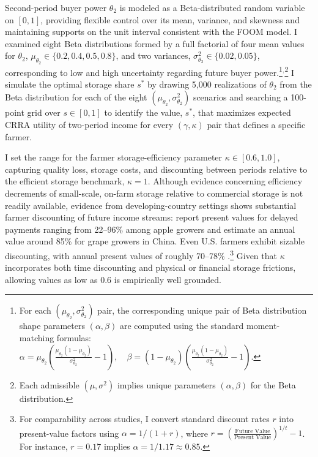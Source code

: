 Second-period buyer power $\theta_2$ is modeled as a Beta-distributed random variable on $[0,1]$, providing flexible control over its mean, variance, and skewness and maintaining supports on the unit interval consistent with the FOOM model. I examined eight Beta distributions formed by a full factorial of four mean values for $\theta_2$, 
$\mu_{\theta_2} \in \{0.2, 0.4, 0.5, 0.8\}$, and two variances, 
$\sigma^2_{\theta_2} \in \{0.02, 0.05\}$, corresponding to low and high uncertainty regarding future buyer power.\footnote{For each $(\mu_{\theta_2}, \sigma^2_{\theta_2})$ pair, the corresponding unique pair of Beta distribution shape parameters $(\alpha, \beta)$ are computed using the standard moment-matching formulas: $\alpha = \mu_{\theta_2} \left( \frac{\mu_{\theta_2}(1 - \mu_{\theta_2})}{\sigma^2_{\theta_2}} - 1 \right), \quad \beta = (1 - \mu_{\theta_2}) \left( \frac{\mu_{\theta_2}(1 - \mu_{\theta_2})}{\sigma^2_{\theta_2}} - 1 \right).$}$^,$\footnote{Each admissible $(\mu,\sigma^2)$ implies unique parameters $(\alpha,\beta)$ for the Beta distribution.} I simulate the optimal storage share $s^*$ by drawing 5{,}000 realizations of $\theta_2$ from the Beta distribution for each of the eight $(\mu_{\theta_2}, \sigma^2_{\theta_2})$ scenarios and searching a 100-point grid over $s \in [0,1]$ to identify the value, $s^*$, that maximizes expected CRRA utility of two-period income for every $(\gamma,\kappa)$ pair that defines a specific farmer.

I set the range for the farmer storage-efficiency parameter $\kappa \in [0.6,1.0]$, capturing quality loss, storage costs, and discounting between periods relative to the efficient storage benchmark, $\kappa = 1$. Although evidence concerning efficiency decrements of small-scale, on-farm storage relative to commercial storage is not readily available, evidence from developing-country settings shows substantial farmer discounting of future income streams: \citet{jin2024losses} report present values for delayed payments ranging from 22--96\% among apple growers and \citet{ding2021time} estimate an annual value around 85\% for grape growers in China. Even U.S. farmers exhibit sizable discounting, with annual present values of roughly 70--78\% \citep{duquette2012farmer}.\footnote{For comparability across studies, I convert standard discount rates $r$ into present-value factors using $\alpha = 1/(1+r)$, where $r = \left(\frac{\text{Future Value}}{\text{Present Value}}\right)^{1/t} - 1$. For instance, $r = 0.17$ implies $\alpha = 1/1.17 \approx 0.85$.} Given that $\kappa$ incorporates both time discounting and physical or financial storage frictions, allowing values as low as 0.6 is empirically well grounded.


